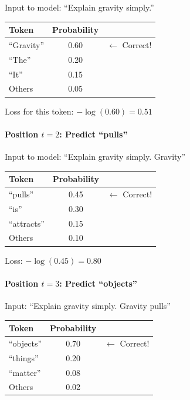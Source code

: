 \begin{chapterenv}
Input to model: ``Explain gravity simply.''

\begin{center}
\begin{tabular}{lcc}
\toprule
\textbf{Token} & \textbf{Probability} & \\
\midrule
``Gravity'' & 0.60 & $\leftarrow$ Correct! \\
``The'' & 0.20 & \\
``It'' & 0.15 & \\
Others & 0.05 & \\
\bottomrule
\end{tabular}
\end{center}

Loss for this token: $-\log(0.60) = 0.51$

\paragraph{Position $t=2$: Predict ``pulls''}

Input to model: ``Explain gravity simply. Gravity''

\begin{center}
\begin{tabular}{lcc}
\toprule
\textbf{Token} & \textbf{Probability} & \\
\midrule
``pulls'' & 0.45 & $\leftarrow$ Correct! \\
``is'' & 0.30 & \\
``attracts'' & 0.15 & \\
Others & 0.10 & \\
\bottomrule
\end{tabular}
\end{center}

Loss: $-\log(0.45) = 0.80$

\paragraph{Position $t=3$: Predict ``objects''}

Input: ``Explain gravity simply. Gravity pulls''

\begin{center}
\begin{tabular}{lcc}
\toprule
\textbf{Token} & \textbf{Probability} & \\
\midrule
``objects'' & 0.70 & $\leftarrow$ Correct! \\
``things'' & 0.20 & \\
``matter'' & 0.08 & \\
Others & 0.02 & \\
\bottomrule
\end{tabular}
\end{center}


\end{chapterenv}
